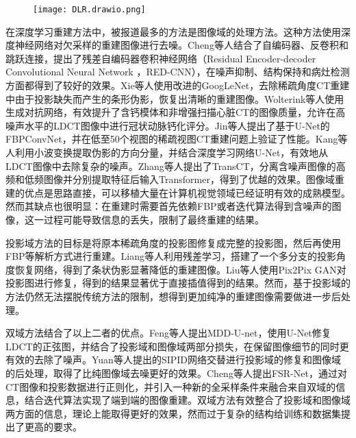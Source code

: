 \begin{figure}[!htp]
  \centering
  \texttt{[image: DLR.drawio.png]}
  \label{fig. DLR}
\end{figure}

在深度学习重建方法中，被报道最多的方法是图像域的处理方法。这种方法使用深度神经网络对欠采样的重建图像进行去噪。Cheng等人结合了自编码器、反卷积和跳跃连接，提出了残差自编码器卷积神经网络（Residual Encoder-decoder Convolutional Neural Network ，RED-CNN），在噪声抑制、结构保持和病灶检测方面都得到了较好的效果\cite{chenLowDoseCTResidual2017}。Xie等人使用改进的GoogLeNet\cite{szegedyGoingDeeperConvolutions2015}，去除稀疏角度CT重建中由于投影缺失而产生的条形伪影，恢复出清晰的重建图像\cite{xieArtifactRemovalUsing2018}。Wolterink等人使用生成对抗网络，有效提升了含钙模体和非增强扫描心脏CT的图像质量，允许在高噪声水平的LDCT图像中进行冠状动脉钙化评分\cite{wolterinkGenerativeAdversarialNetworks2017}。Jin等人提出了基于U-Net的FBPConvNet，并在低至50个视图的稀疏视图CT重建问题上验证了性能\cite{jinDeepConvolutionalNeural2017}。Kang等人利用小波变换提取伪影的方向分量，并结合深度学习网络U-Net，有效地从LDCT图像中去除复杂的噪声\cite{kangDeepConvolutionalNeural2017}。Zhang等人提出了TransCT，分离含噪声图像的高频和低频图像并分别提取特征后输入Transformer\cite{vaswaniAttentionAllYou2017}，得到了优越的效果\cite{zhangTransCTDualPathTransformer2021}。图像域重建的优点是思路直接，可以移植大量在计算机视觉领域已经证明有效的成熟模型。然而其缺点也很明显：在重建时需要首先依赖FBP或者迭代算法得到含噪声的图像，这一过程可能导致信息的丢失，限制了最终重建的结果。

投影域方法的目标是将原本稀疏角度的投影图修复成完整的投影图，然后再使用FBP等解析方式进行重建。Liang等人利用残差学习，搭建了一个多分支的投影角度恢复网络，得到了条状伪影显著降低的重建图像\cite{liangImproveAngularResolution2018}。Liu等人使用Pix2Pix GAN\cite{isolaImageToImageTranslationConditional2017}对投影图进行修复，得到的结果显著优于直接插值得到的结果\cite{liuSparsesamplingCTSinogram2020}。然而，基于投影域的方法仍然无法摆脱传统方法的限制，想得到更加纯净的重建图像需要做进一步后处理。

双域方法结合了以上二者的优点。Feng等人提出MDD-U-net，使用U-Net修复LDCT的正弦图，并结合了投影域和图像域两部分损失，在保留图像细节的同时更有效的去除了噪声\cite{fengPreliminaryStudyProjection2020a}。Yuan等人提出的SIPID网络交替进行投影域的修复和图像域的后处理，取得了比纯图像域去噪更好的效果\cite{yuanSIPIDDeepLearning2018}。Cheng等人提出FSR-Net，通过对CT图像和投影数据进行正则化，并引入一种新的全采样条件来融合来自双域的信息，结合迭代算法实现了端到端的图像重建\cite{chengLearnedFullSamplingReconstruction2020a}。双域方法有效整合了投影域和图像域两方面的信息，理论上能取得更好的效果，然而过于复杂的结构给训练和数据集提出了更高的要求。

